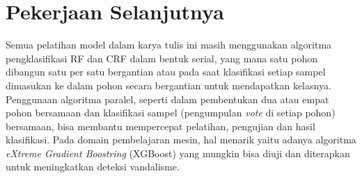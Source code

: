\section{Pekerjaan Selanjutnya}

Semua pelatihan model dalam karya tulis ini masih menggunakan algoritma
pengklasifikasi RF dan CRF dalam bentuk serial, yang mana satu pohon dibangun
satu per satu bergantian atau pada saat klasifikasi setiap sampel dimasukan ke
dalam pohon secara bergantian untuk mendapatkan kelasnya.
Penggunaan algoritma paralel, seperti dalam pembentukan dua atau empat pohon
bersamaan dan klasifikasi sampel (pengumpulan \textit{vote} di setiap pohon)
bersamaan, bisa membantu mempercepat pelatihan, pengujian dan hasil
klasifikasi.
Pada domain pembelajaran mesin, hal menarik yaitu adanya algoritma
\textit{eXtreme Gradient Boostring} (XGBoost) yang mungkin bisa diuji dan
diterapkan untuk meningkatkan deteksi vandalisme.
